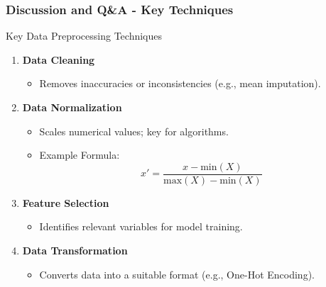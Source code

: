 \documentclass[aspectratio=169]{beamer}
\begin{document}
\begin{frame}[fragile]
    \frametitle{Discussion and Q\&A - Key Techniques}
    \begin{block}{Key Data Preprocessing Techniques}
        \begin{enumerate}
            \item \textbf{Data Cleaning}
              \begin{itemize}
                  \item Removes inaccuracies or inconsistencies (e.g., mean imputation).
              \end{itemize}
            \item \textbf{Data Normalization}
              \begin{itemize}
                  \item Scales numerical values; key for algorithms.
                  \item Example Formula: 
                      \begin{equation}
                      x' = \frac{x - \text{min}(X)}{\text{max}(X) - \text{min}(X)}
                      \end{equation}
              \end{itemize}
            \item \textbf{Feature Selection}
              \begin{itemize}
                  \item Identifies relevant variables for model training.
              \end{itemize}
            \item \textbf{Data Transformation}
              \begin{itemize}
                  \item Converts data into a suitable format (e.g., One-Hot Encoding).
              \end{itemize}
        \end{enumerate}
    \end{block}
\end{frame}
\end{document}
